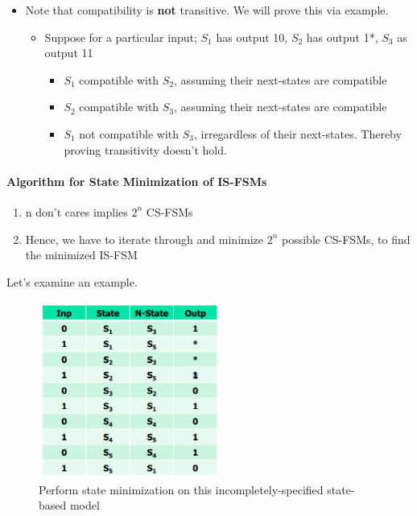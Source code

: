 \documentclass{article}
\begin{document}
\begin{itemize}
\begin{figure}[htp]
        \end{figure}
    \item Note that compatibility is \textbf{not} transitive. We will prove this via example.
        \begin{itemize}
            \item Suppose for a particular input; $S_{1}$ has output 10, $S_{2}$ has output 1*, $S_{3}$ as output 11
                \begin{itemize}
                    \item $S_{1}$ compatible with $S_{2}$, assuming their next-states are compatible
                    \item $S_{2}$ compatible with $S_{3}$, assuming their next-states are compatible
                    \item $S_{1}$ not compatible with $S_{3}$, irregardless of their next-states. Thereby proving transitivity doesn't hold.
                \end{itemize}
        \end{itemize}
\end{itemize}

\paragraph{Algorithm for State Minimization of IS-FSMs}

\begin{enumerate}
    \item n don't cares implies $2^{n}$ CS-FSMs
    \item Hence, we have to iterate through and minimize $2^{n}$ possible CS-FSMs, to find the minimized IS-FSM
\end{enumerate}

\vspace{0.5cm}
Let's examine an example.

\begin{figure}[htp]
    \centering
    \includegraphics[width=6cm, scale=1]{S2/stateMinimization_IS.PNG}
    \caption{Perform state minimization on this incompletely-specified state-based model}
\end{figure}
\end{document}
